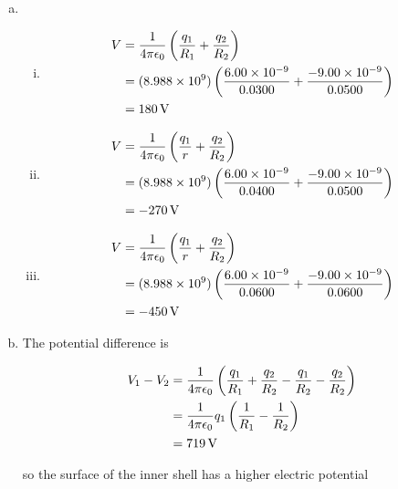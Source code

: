 \documentclass{article}
\begin{document}
\begin{enumerate}[a)]
  \item

        \begin{enumerate}[i)]
          \item

                \begin{align*}
                  V & = \frac{1}{4 \pi \epsilon_0} \left( \frac{q_1}{R_1} + \frac{q_2}{R_2} \right)                                        \\
                    & = (\num{8.988e9}) \left( \frac{\num{6.00e-9}}{0.0300} + \frac{\num{-9.00e-9}}{0.0500} \right) \\
                    & = \qty{180}{V}
                \end{align*}

          \item

                \begin{align*}
                  V & = \frac{1}{4 \pi \epsilon_0} \left( \frac{q_1}{r} + \frac{q_2}{R_2} \right)                                          \\
                    & = (\num{8.988e9}) \left( \frac{\num{6.00e-9}}{0.0400} + \frac{\num{-9.00e-9}}{0.0500} \right) \\
                    & = \qty{-270}{V}
                \end{align*}

          \item

                \begin{align*}
                  V & = \frac{1}{4 \pi \epsilon_0} \left( \frac{q_1}{r} + \frac{q_2}{R_2} \right)                                          \\
                    & = (\num{8.988e9}) \left( \frac{\num{6.00e-9}}{0.0600} + \frac{\num{-9.00e-9}}{0.0600} \right) \\
                    & = \qty{-450}{V}
                \end{align*}
        \end{enumerate}

  \item The potential difference is

        \begin{align*}
          V_1 - V_2 & = \frac{1}{4 \pi \epsilon_0} \left( \frac{q_1}{R_1} + \frac{q_2}{R_2} - \frac{q_1}{R_2} - \frac{q_2}{R_2} \right) \\
                    & = \frac{1}{4 \pi \epsilon_0} q_1 \left( \frac{1}{R_1} - \frac{1}{R_2} \right)                                     \\
                    & = \qty{719}{V}
        \end{align*}

        so the surface of the inner shell has a higher electric potential
\end{enumerate}
\end{document}
